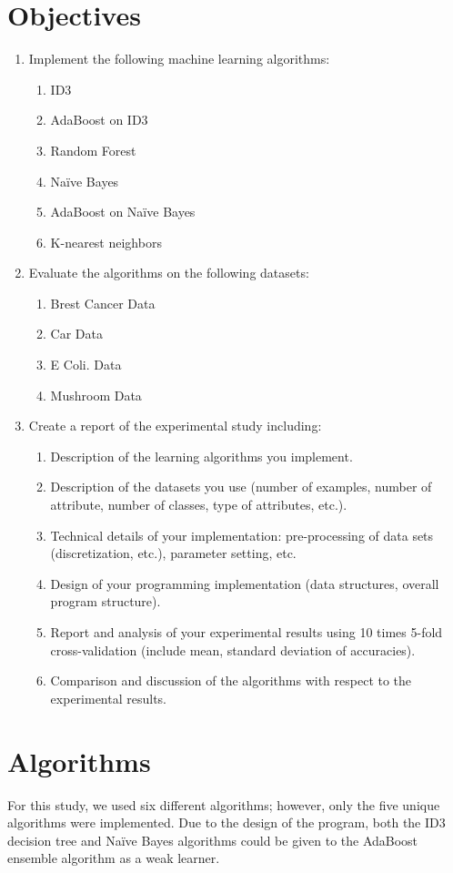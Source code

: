 \documentclass[11pt]{article}
\begin{document}
\section{Objectives}
\begin{enumerate}
  \item Implement the following machine learning algorithms:
  \begin{enumerate}
    \item ID3
    \item AdaBoost on ID3
    \item Random Forest
    \item Naïve Bayes
    \item AdaBoost on Naïve Bayes
    \item K-nearest neighbors
  \end{enumerate}
  \item Evaluate the algorithms on the following datasets:
  \begin{enumerate}
    \item Brest Cancer Data
    \item Car Data
    \item E Coli. Data
    \item Mushroom Data
  \end{enumerate}
  \item Create a report of the experimental study including:
  \begin{enumerate}
    \item Description of the learning algorithms you implement.
    \item Description of the datasets you use (number of examples, number of attribute, number of classes, type of attributes, etc.).
    \item Technical details of your implementation: pre-processing of data sets (discretization, etc.), parameter setting, etc.
    \item Design of your programming implementation (data structures, overall program structure).
    \item Report and analysis of your experimental results using 10 times 5-fold cross-validation (include mean, standard deviation of accuracies).
    \item Comparison and discussion of the algorithms with respect to the experimental results.
  \end{enumerate}
\end{enumerate}

\section{Algorithms}
For this study, we used six different algorithms; however, only the five unique algorithms were implemented. Due to the design of the program, both the ID3 decision tree and Naïve Bayes algorithms could be given to the AdaBoost ensemble algorithm as a weak learner.
\end{document}
